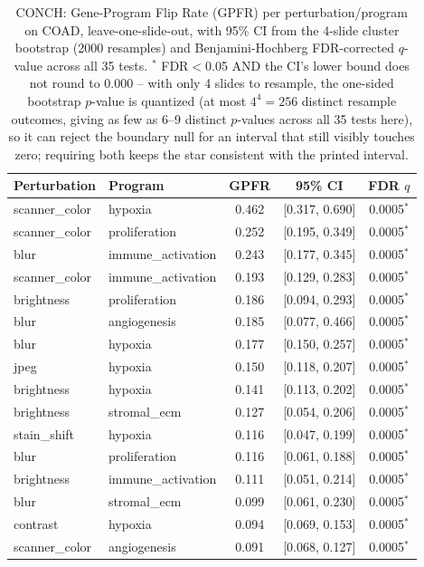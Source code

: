 \begin{table}[t]
\centering
\caption{CONCH: Gene-Program Flip Rate (GPFR) per perturbation/program on COAD, leave-one-slide-out, with 95\% CI from the 4-slide cluster bootstrap (2000 resamples) and Benjamini-Hochberg FDR-corrected $q$-value across all 35 tests. $^{*}$ FDR$<$0.05 AND the CI's lower bound does not round to 0.000 -- with only 4 slides to resample, the one-sided bootstrap $p$-value is quantized (at most $4^4=256$ distinct resample outcomes, giving as few as 6--9 distinct $p$-values across all 35 tests here), so it can reject the boundary null for an interval that still visibly touches zero; requiring both keeps the star consistent with the printed interval.}
\label{tab:gpfr_loso_coad_conch}
\begin{tabular}{llccc}
\toprule
Perturbation & Program & GPFR & 95\% CI & FDR $q$ \\
\midrule
scanner\_color & hypoxia & 0.462 & [0.317, 0.690] & 0.0005$^{*}$ \\
scanner\_color & proliferation & 0.252 & [0.195, 0.349] & 0.0005$^{*}$ \\
blur & immune\_activation & 0.243 & [0.177, 0.345] & 0.0005$^{*}$ \\
scanner\_color & immune\_activation & 0.193 & [0.129, 0.283] & 0.0005$^{*}$ \\
brightness & proliferation & 0.186 & [0.094, 0.293] & 0.0005$^{*}$ \\
blur & angiogenesis & 0.185 & [0.077, 0.466] & 0.0005$^{*}$ \\
blur & hypoxia & 0.177 & [0.150, 0.257] & 0.0005$^{*}$ \\
jpeg & hypoxia & 0.150 & [0.118, 0.207] & 0.0005$^{*}$ \\
brightness & hypoxia & 0.141 & [0.113, 0.202] & 0.0005$^{*}$ \\
brightness & stromal\_ecm & 0.127 & [0.054, 0.206] & 0.0005$^{*}$ \\
stain\_shift & hypoxia & 0.116 & [0.047, 0.199] & 0.0005$^{*}$ \\
blur & proliferation & 0.116 & [0.061, 0.188] & 0.0005$^{*}$ \\
brightness & immune\_activation & 0.111 & [0.051, 0.214] & 0.0005$^{*}$ \\
blur & stromal\_ecm & 0.099 & [0.061, 0.230] & 0.0005$^{*}$ \\
contrast & hypoxia & 0.094 & [0.069, 0.153] & 0.0005$^{*}$ \\
scanner\_color & angiogenesis & 0.091 & [0.068, 0.127] & 0.0005$^{*}$ \\

\end{tabular}
\end{table}
